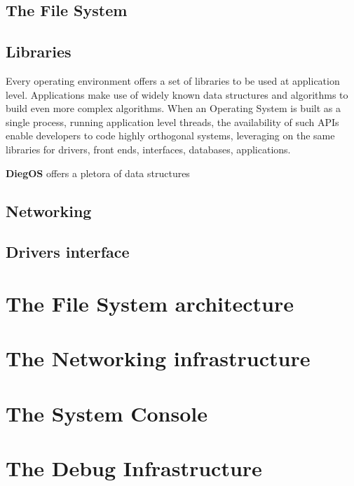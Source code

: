 \documentclass[11pt,b5paper]{scrbook}
\newcommand{\myOS}{{\color{SteelBlue}\textbf{DiegOS}}}
\begin{document}
\section{The File System}

\section{Libraries}

Every operating  environment offers a set of libraries to be used
at application level.
Applications make use of widely known data structures and algorithms
to build even more complex algorithms.
When an Operating System is built as a single process, running application
level threads, the availability of such APIs enable developers to code
highly orthogonal systems, leveraging on the same libraries for drivers,
front ends, interfaces, databases, applications.

{\myOS} offers a pletora of data structures
\section{Networking}

\section{Drivers interface}

\chapter{The File System architecture}
\newpage
\lipsum

\chapter{The Networking infrastructure}
\newpage
\lipsum

\chapter{The System Console}
\newpage
\lipsum

\chapter{The Debug Infrastructure}
\newpage
\lipsum
\end{document}
